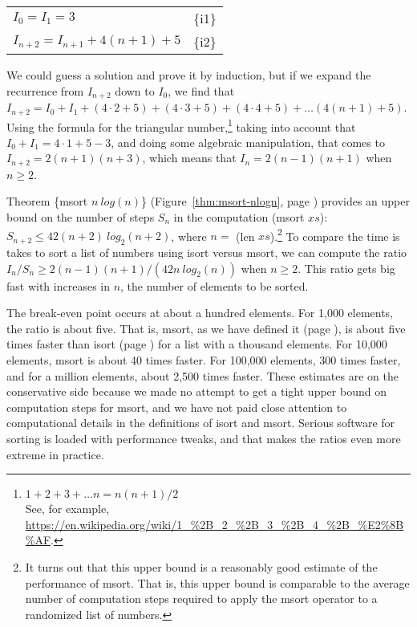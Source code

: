\begin{center}
\begin{tabular}{ll}
$I_0 = I_1 = 3$              & \{i1\} \\
$I_{n+2} = I_{n+1} + 4(n+1) + 5$ & \{i2\} \\
\end{tabular}
\end{center}

We could guess a solution and prove it by induction,
but if we expand the recurrence from $I_{n+2}$ down to $I_0$,
we find that
$I_{n+2} = I_0 + I_1 + (4\cdot 2 + 5) + (4\cdot 3 + 5) + (4\cdot 4 + 5) + \dots (4(n+1) + 5)$.
Using the formula for the triangular number,\footnote{$1 + 2 + 3 + \dots n = n(n+1)/2$ \\
See, for example, \url{https://en.wikipedia.org/wiki/1_\%2B_2_\%2B_3_\%2B_4_\%2B_\%E2\%8B\%AF}.}
taking into account that $I_0 + I_1 = 4\cdot 1+5-3$, and doing some algebraic manipulation,
that comes to $I_{n+2} = 2(n+1)(n+3)$, which means that $I_{n} = 2(n-1)(n+1)$ when $n \geq 2$.

Theorem \{msort $n~log(n)$\}
(Figure~\ref{thm:msort-nlogn}, page \pageref{thm:msort-nlogn}) provides
an upper bound on the number of steps $S_n$ in the computation (msort $xs$):
$S_{n+2} \leq 42(n+2)~log_2(n+2)$, where $n =$ (len $xs$).\footnote{It 
turns out that this upper bound is a reasonably good estimate
of the performance of msort.
That is, this upper bound is comparable to the average number
of computation steps required to apply the msort operator
to a randomized list of numbers.}
To compare the time is takes to sort a list of numbers using isort versus msort,
we can compute the ratio $I_n/S_n \geq 2(n-1)(n+1)/(42n~log_2(n))$ when $n \geq 2$.
This ratio gets big fast with increases in $n$, the number of elements to be sorted.

The break-even point occurs at about a hundred elements.
For 1,000 elements, the ratio is about five.
That is, msort, as we have defined it (page \pageref{defun:msort-copy}),
is about five times faster
than isort (page \pageref{defun:insert-isort-copy})
for a list with a thousand elements.
For 10,000 elements, msort is about 40 times faster.
For 100,000 elements, 300 times faster,
and for a million elements, about 2,500 times faster.
These estimates are on the conservative side
because we made no attempt to get a tight
upper bound on computation steps for msort,
and we have not paid close attention to computational details
in the definitions of isort and  msort.
Serious software for sorting is loaded with performance tweaks,
and that makes the ratios even more extreme in practice.

